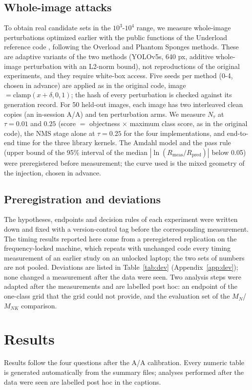 \documentclass[a4paper,fleqn]{cas-dc}
\newcommand{\Ntau}{N_{\tau}}
\begin{document}
\subsection{Whole-image attacks}
To obtain real candidate sets in the $10^3$-$10^4$ range, we measure whole-image perturbations optimized earlier with the public functions of the Underload reference code \cite{underload2025}, following the Overload \cite{overload2024} and Phantom Sponges \cite{phantom2023} methods. These are adaptive variants of the two methods (YOLOv5s, 640 px, additive whole-image perturbation with an L2-norm bound), not reproductions of the original experiments, and they require white-box access. Five seeds per method (0-4, chosen in advance) are applied as in the original code, image $=\mathrm{clamp}(x+\delta,0,1)$; the hash of every perturbation is checked against its generation record. For 50 held-out images, each image has two interleaved clean copies (an in-session A/A) and ten perturbation arms. We measure $\Ntau$ at $\tau=0.01$ and $0.25$ (score $=$ objectness $\times$ maximum class score, as in the original code), the NMS stage alone at $\tau=0.25$ for the four implementations, and end-to-end time for the three library kernels. The Amdahl model and the pass rule (upper bound of the 95\% interval of the median $|\ln(R_{\mathrm{meas}}/R_{\mathrm{pred}})|$ below 0.05) were preregistered before measurement; the curve used is the mixed geometry of the injection, chosen in advance.

\subsection{Preregistration and deviations}
The hypotheses, endpoints and decision rules of each experiment were written down and fixed with a version-control tag before the corresponding measurement. The timing results reported here come from a preregistered replication on the frequency-locked machine, which repeats with unchanged code every timing measurement of an earlier study on an unlocked laptop; the two sets of numbers are not pooled. Deviations are listed in Table~\ref{tab:dev} (Appendix~\ref{app:dev}); none changed a measurement after the data were seen. Two analysis steps were adapted after the measurements and are labelled post hoc: an endpoint of the one-class grid that the grid could not provide, and the evaluation set of the $M_N$/$M_{NK}$ comparison.


\section{Results}
\label{sec:results}
Results follow the four questions after the A/A calibration. Every numeric table is generated automatically from the summary files; analyses performed after the data were seen are labelled post hoc in the captions.
\end{document}
